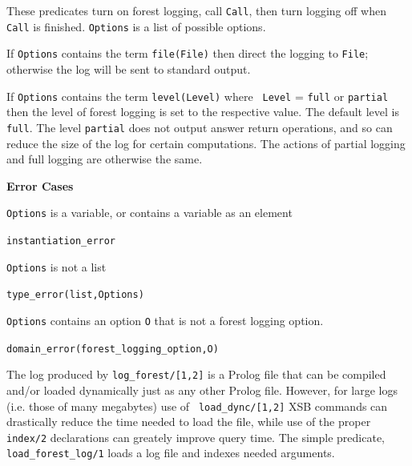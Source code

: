 \begin{description}
%
These predicates turn on forest logging, call {\tt Call}, then turn
logging off when {\tt Call} is finished.  {\tt Options} is a list of
possible options.
%
\bi
\item If {\tt Options} contains the term {\tt file(File)} then direct
  the logging to {\tt File}; otherwise the log will be sent to
  standard output.
\item If {\tt Options} contains the term {\tt level(Level)} where {\tt
  Level} = {\tt full} or {\tt partial} then the level of forest
  logging is set to the respective value.  The default level is {\tt
    full}.  The level {\tt partial} does not output answer return
  operations, and so can reduce the size of the log for certain
  computations.  The actions of partial logging and full logging are
  otherwise the same.  \ei

{\bf Error Cases} 
\bi
\item {\tt Options} is a variable, or contains a variable as an element
\bi
\item {\tt instantiation\_error}
\ei
\item {\tt Options} is not a list
\bi
\item {\tt type\_error(list,Options)}
\ei
\item {\tt Options} contains an option {\tt O} that is not a forest
  logging option.  
\bi
\item {\tt domain\_error(forest\_logging\_option,O)}
\ei
\ei


%
The log produced by {\tt log\_forest/[1,2]} is a Prolog file that can
be compiled and/or loaded dynamically just as any other Prolog file.
However, for large logs (i.e. those of many megabytes) use of {\tt
  load\_dync/[1,2]} XSB commands can drastically reduce the time
needed to load the file, while use of the proper {\tt index/2}
declarations can greately improve query time.  The simple predicate,
{\tt load\_forest\_log/1} loads a log file and indexes needed arguments.
\end{description}

